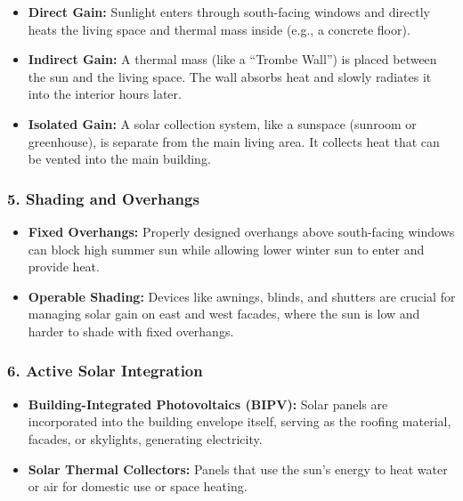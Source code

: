 \documentclass[
  10pt,
  letterpaper,
]{scrbook}
\providecommand{\tightlist}{%
  \setlength{\itemsep}{0pt}\setlength{\parskip}{0pt}}
\begin{document}
\begin{itemize}
\tightlist
\item
  \textbf{Direct Gain:} Sunlight enters through south-facing windows and
  directly heats the living space and thermal mass inside (e.g., a
  concrete floor).
\item
  \textbf{Indirect Gain:} A thermal mass (like a ``Trombe Wall'') is
  placed between the sun and the living space. The wall absorbs heat and
  slowly radiates it into the interior hours later.
\item
  \textbf{Isolated Gain:} A solar collection system, like a sunspace
  (sunroom or greenhouse), is separate from the main living area. It
  collects heat that can be vented into the main building.
\end{itemize}

\subsubsection{5. Shading and Overhangs}\label{shading-and-overhangs}

\begin{itemize}
\tightlist
\item
  \textbf{Fixed Overhangs:} Properly designed overhangs above
  south-facing windows can block high summer sun while allowing lower
  winter sun to enter and provide heat.
\item
  \textbf{Operable Shading:} Devices like awnings, blinds, and shutters
  are crucial for managing solar gain on east and west facades, where
  the sun is low and harder to shade with fixed overhangs.
\end{itemize}

\subsubsection{6. Active Solar
Integration}\label{active-solar-integration}

\begin{itemize}
\tightlist
\item
  \textbf{Building-Integrated Photovoltaics (BIPV):} Solar panels are
  incorporated into the building envelope itself, serving as the roofing
  material, facades, or skylights, generating electricity.
\item
  \textbf{Solar Thermal Collectors:} Panels that use the sun's energy to
  heat water or air for domestic use or space heating.
\end{itemize}
\end{document}
